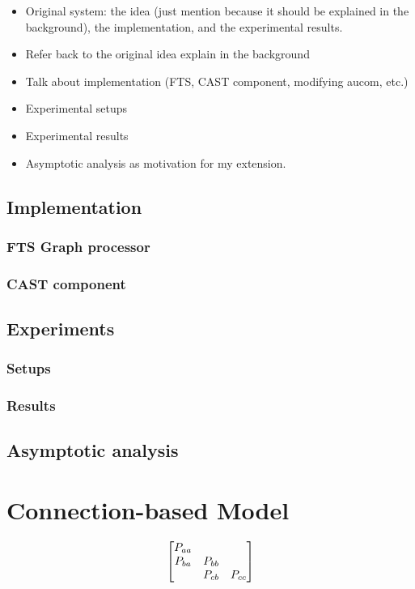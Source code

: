 \documentclass[11pt, a4paper]{report}
\begin{document}
\begin{itemize}
\item Original system: the idea (just mention because it should be
  explained in the background), the implementation, and the
  experimental results.
\item Refer back to the original idea explain in the background
\item Talk about implementation (FTS, CAST component, modifying aucom, etc.)
\item Experimental setups
\item Experimental results
\item Asymptotic analysis as motivation for my extension.
\end{itemize}

\section{Implementation}
\subsection{FTS Graph processor}
\subsection{CAST component}
\section{Experiments}
\subsection{Setups}
\subsection{Results}
\section{Asymptotic analysis}

\chapter{Connection-based Model}
\label{cha:conn-based-model}

\[
\begin{bmatrix}
  P_{aa} & \empty & \empty\\
  P_{ba} & P_{bb} & \empty\\
  \empty & P_{cb} & P_{cc}
\end{bmatrix}
\]
\end{document}
